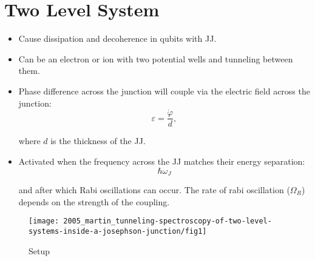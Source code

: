 \newpage

\section{Two Level System}
\label{sec:two-level-system}

\begin{framed}\noindent
  \begin{itemize}
  \item Cause dissipation and decoherence in qubits with JJ.
  \item  Can be  an  electron or  ion with  two  potential wells  and
    tunneling between them.
  \item  Phase difference  across the  junction will  couple via  the
    electric field across the junction:
    \begin{equation}
      \mathcal{\varepsilon} = \frac{\dot{\varphi}}{d},
    \end{equation}

    \noindent where $d$ is the thickness of the JJ.
  \item  Activated when  the frequency  across the  JJ matches  their
    energy separation:
    \begin{equation}
      \hbar\omega_{J}
    \end{equation}

    \noindent and after  which Rabi oscillations can  occur. The rate
    of rabi oscillation  ($\Omega_R$) depends on the  strength of the
    coupling.
  \end{itemize}
\end{framed}

\begin{figure}[h]
  \centering
  \texttt{[image: 2005\_martin\_tunneling-spectroscopy-of-two-level-systems-inside-a-josephson-junction/fig1]}
  \caption{\small
    Setup\label{fig:2005_martin_tunneling-spectroscopy-of-two-level-systems-inside-a-josephson-junction/fig1}}
\end{figure}



